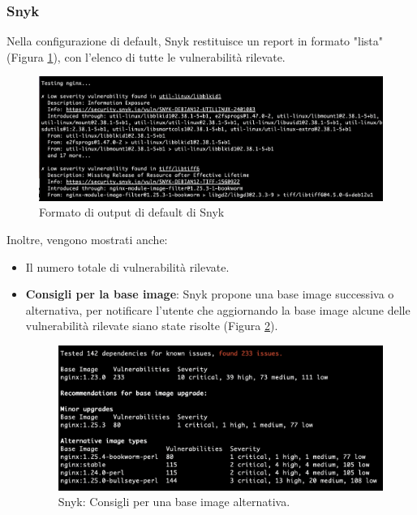 \subsubsection{Snyk}
Nella configurazione di default, Snyk restituisce un report in formato "lista" (Figura \ref{fig:snyk_output_fmt}), con l'elenco di tutte le vulnerabilità rilevate.
\begin{figure}[H]
   \centering
   \includegraphics[width=1\textwidth]{immagini/capitolo2/snyk_output_fmt.png}
   \caption{Formato di output di default di Snyk}
   \label{fig:snyk_output_fmt}
\end{figure}

Inoltre, vengono mostrati anche:
\begin{itemize}
   \item Il numero totale di vulnerabilità rilevate.
   \item \textbf{Consigli per la base image}: Snyk propone una base image successiva o alternativa, per notificare l'utente che aggiornando la base image alcune delle vulnerabilità rilevate siano state risolte (Figura \ref{fig:snyk_altn_imgs}).
         \begin{figure}[H]
            \centering
            \includegraphics[width=1\textwidth]{immagini/capitolo2/snyk_altn_images.png}
            \caption{Snyk: Consigli per una base image alternativa.}
            \label{fig:snyk_altn_imgs}
         \end{figure}
\end{itemize}

